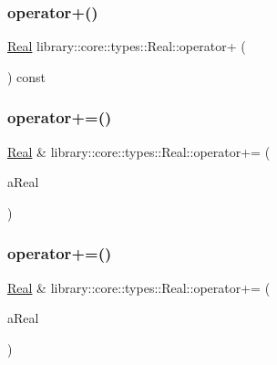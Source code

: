 \subsubsection{\texorpdfstring{operator+()}{operator+()}\hspace{0.1cm}{\footnotesize\ttfamily [4/4]}}
{\footnotesize\ttfamily \hyperlink{classlibrary_1_1core_1_1types_1_1_real}{Real} library\+::core\+::types\+::\+Real\+::operator+ (\begin{DoxyParamCaption}{ }\end{DoxyParamCaption}) const}

\mbox{\label{classlibrary_1_1core_1_1types_1_1_real_a9d6119549877717ef91876e1e53c78f9}} 
\subsubsection{\texorpdfstring{operator+=()}{operator+=()}\hspace{0.1cm}{\footnotesize\ttfamily [1/2]}}
{\footnotesize\ttfamily \hyperlink{classlibrary_1_1core_1_1types_1_1_real}{Real} \& library\+::core\+::types\+::\+Real\+::operator+= (\begin{DoxyParamCaption}\item[{const \hyperlink{classlibrary_1_1core_1_1types_1_1_real}{Real} \&}]{a\+Real }\end{DoxyParamCaption})}

\mbox{\label{classlibrary_1_1core_1_1types_1_1_real_af83f8f060152f4170325c20e521bb219}} 
\subsubsection{\texorpdfstring{operator+=()}{operator+=()}\hspace{0.1cm}{\footnotesize\ttfamily [2/2]}}
{\footnotesize\ttfamily \hyperlink{classlibrary_1_1core_1_1types_1_1_real}{Real} \& library\+::core\+::types\+::\+Real\+::operator+= (\begin{DoxyParamCaption}\item[{const \hyperlink{classlibrary_1_1core_1_1types_1_1_real_a9c5c8826b7e5a8e39544d23fea6c0e1c}{Real\+::\+Value\+Type} \&}]{a\+Real }\end{DoxyParamCaption})}

